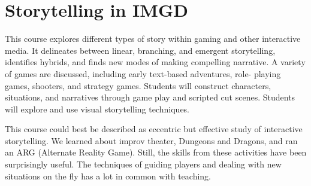 \section{Storytelling in IMGD}

\begin{meta}
\end{meta}


\coursedesc
This course explores different types of story within gaming and other
interactive media. It delineates between linear, branching, and emergent
storytelling, identifies hybrids, and finds new modes of making
compelling narrative. A variety of games are discussed, including early
text-based adventures, role- playing games, shooters, and strategy
games. Students will construct characters, situations, and narratives
through game play and scripted cut scenes. Students will explore and use
visual storytelling techniques.

\courseself
This course could best be described as eccentric but effective study
of interactive storytelling. We learned about improv theater, Dungeons
and Dragons, and ran an ARG (Alternate Reality Game). Still, the skills
from these activities have been surprisingly useful. The techniques of
guiding players and dealing with new situations on the fly has a lot in
common with teaching.

